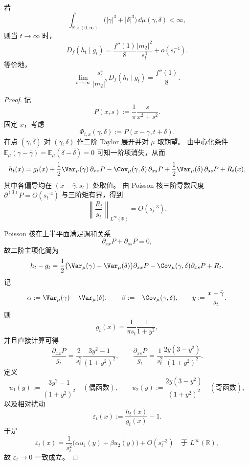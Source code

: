 \begin{theorem}\label{thm:xi-poisson-cauchy-f-divergence-sharp-asymptotic}
若
\[
\int_{\mathbb R\times(0,\infty)}\bigl(|\gamma|^3+|\delta|^3\bigr)\,\dd\mu(\gamma,\delta)<\infty,
\]
则当 \(t\to\infty\) 时，
\[
D_f(h_t\mid g_t)
=\frac{f''(1)}{8}\frac{|m_2|^2}{s_t^4}
+o\!\left(s_t^{-4}\right).
\]
等价地，
\[
\lim_{t\to\infty}\frac{s_t^4}{|m_2|^2}D_f(h_t\mid g_t)=\frac{f''(1)}{8}.
\]
\end{theorem}
\begin{proof}
记
\[
P(x,s):=\frac{1}{\pi}\frac{s}{x^2+s^2}.
\]
固定 \(x\)，考虑
\[
\Phi_{t,x}(\gamma,\delta):=P(x-\gamma,t+\delta).
\]
在点 \((\bar\gamma,\bar\delta)\) 对 \((\gamma,\delta)\) 作二阶 Taylor 展开并对 \(\mu\) 取期望。
由中心化条件
\(
\mathbb E_\mu(\gamma-\bar\gamma)=\mathbb E_\mu(\delta-\bar\delta)=0
\)
可知一阶项消失，从而
\[
h_t(x)=g_t(x)
+\frac{1}{2}\Var_\mu(\gamma)\,\partial_{xx}P
-\Cov_\mu(\gamma,\delta)\,\partial_{xs}P
+\frac{1}{2}\Var_\mu(\delta)\,\partial_{ss}P
+R_t(x),
\]
其中各偏导均在 \((x-\bar\gamma,s_t)\) 处取值。
由 Poisson 核三阶导数尺度 \(\partial^{(3)}P=O(s_t^{-4})\) 与三阶矩有界，得到
\[
\left\|\frac{R_t}{g_t}\right\|_{L^\infty(\mathbb R)}=O(s_t^{-3}).
\]

Poisson 核在上半平面满足调和关系
\[
\partial_{xx}P+\partial_{ss}P=0,
\]
故二阶主项化简为
\[
h_t-g_t
=\frac{1}{2}\bigl(\Var_\mu(\gamma)-\Var_\mu(\delta)\bigr)\partial_{xx}P
-\Cov_\mu(\gamma,\delta)\partial_{xs}P
+R_t.
\]
记
\[
\alpha:=\Var_\mu(\gamma)-\Var_\mu(\delta),\qquad
\beta:=-\Cov_\mu(\gamma,\delta),\qquad
y:=\frac{x-\bar\gamma}{s_t}.
\]
则
\[
g_t(x)=\frac{1}{\pi s_t}\frac{1}{1+y^2},
\]
并且直接计算可得
\[
\frac{\partial_{xx}P}{g_t}
=\frac{2}{s_t^2}\frac{3y^2-1}{(1+y^2)^2},
\qquad
\frac{\partial_{xs}P}{g_t}
=\frac{1}{s_t^2}\frac{2y(3-y^2)}{(1+y^2)^2}.
\]
定义
\[
u_1(y):=\frac{3y^2-1}{(1+y^2)^2}\quad(\text{偶函数}),\qquad
u_2(y):=\frac{2y(3-y^2)}{(1+y^2)^2}\quad(\text{奇函数}),
\]
以及相对扰动
\[
\varepsilon_t(x):=\frac{h_t(x)}{g_t(x)}-1.
\]
于是
\[
\varepsilon_t(x)
=\frac{1}{s_t^2}\bigl(\alpha u_1(y)+\beta u_2(y)\bigr)
+O(s_t^{-3})
\quad\text{于 }L^\infty(\mathbb R),
\]
故 \(\varepsilon_t\to0\) 一致成立。


\end{proof}
